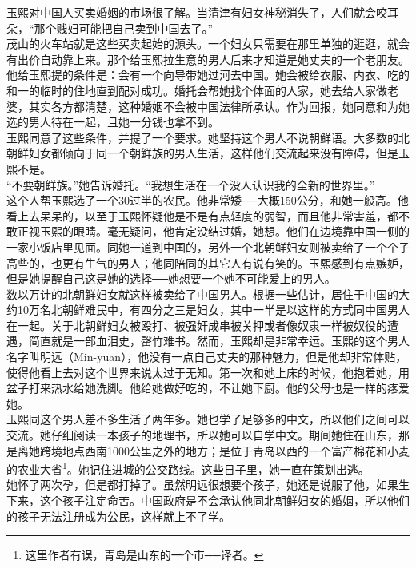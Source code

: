 玉熙对中国人买卖婚姻的市场很了解。当清津有妇女神秘消失了，人们就会咬耳朵，“那个贱妇可能把自己卖到中国去了。”\\

茂山的火车站就是这些买卖起始的源头。一个妇女只需要在那里单独的逛逛，就会有出价自动靠上来。那个给玉熙拉生意的男人后来才知道是她丈夫的一个老朋友。他给玉熙提的条件是：会有一个向导带她过河去中国。她会被给衣服、内衣、吃的和一的临时的住地直到配对成功。婚托会帮她找个体面的人家，她去给人家做老婆，其实各方都清楚，这种婚姻不会被中国法律所承认。作为回报，她同意和为她选的男人待在一起，且她一分钱也拿不到。\\

玉熙同意了这些条件，并提了一个要求。她坚持这个男人不说朝鲜语。大多数的北朝鲜妇女都倾向于同一个朝鲜族的男人生活，这样他们交流起来没有障碍，但是玉熙不是。\\

“不要朝鲜族。”她告诉婚托。“我想生活在一个没人认识我的全新的世界里。”\\

这个人帮玉熙选了一个30过半的农民。他非常矮──大概150公分，和她一般高。他看上去呆呆的，以至于玉熙怀疑他是不是有点轻度的弱智，而且他非常害羞，都不敢正视玉熙的眼睛。毫无疑问，他肯定没结过婚，她想。他们在边境靠中国一侧的一家小饭店里见面。同她一道到中国的，另外一个北朝鲜妇女则被卖给了一个个子高些的，也更有生气的男人；他同陪同的其它人有说有笑的。玉熙感到有点嫉妒，但是她提醒自己这是她的选择──她想要一个她不可能爱上的男人。\\

数以万计的北朝鲜妇女就这样被卖给了中国男人。根据一些估计，居住于中国的大约10万名北朝鲜难民中，有四分之三是妇女，其中一半是以这样的方式同中国男人在一起。关于北朝鲜妇女被殴打、被强奸成串被关押或者像奴隶一样被奴役的遭遇，简直就是一部血泪史，罄竹难书。然而，玉熙却是非常幸运。玉熙的这个男人名字叫明远（Min-yuan），他没有一点自己丈夫的那种魅力，但是他却非常体贴，使得他看上去对这个世界来说太过于无知。第一次和她上床的时候，他抱着她，用盆子打来热水给她洗脚。他给她做好吃的，不让她下厨。他的父母也是一样的疼爱她。\\

玉熙同这个男人差不多生活了两年多。她也学了足够多的中文，所以他们之间可以交流。她仔细阅读一本孩子的地理书，所以她可以自学中文。期间她住在山东，那是离她跨境地点西南1000公里之外的地方；是位于青岛以西的一个富产棉花和小麦的农业大省\footnote{这里作者有误，青岛是山东的一个市──译者。}。她记住进城的公交路线。这些日子里，她一直在策划出逃。\\

她怀了两次孕，但是都打掉了。虽然明远很想要个孩子，她还是说服了他，如果生下来，这个孩子注定命苦。中国政府是不会承认他同北朝鲜妇女的婚姻，所以他们的孩子无法注册成为公民，这样就上不了学。\\

